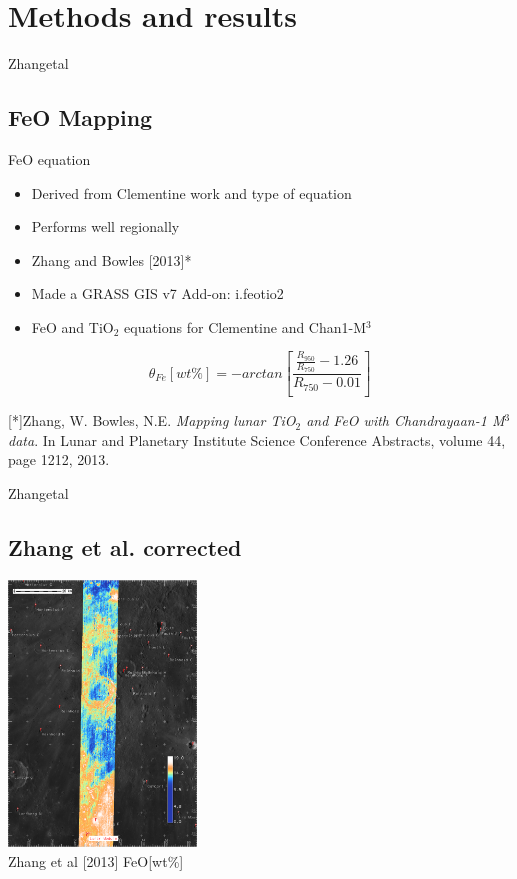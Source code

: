 \documentclass[aspectratio=169,unknownkeysallowed,xcolor=dvipsnames,beamer]{beamer} %
\begin{document}
\section{Methods and results}
\begin{frame}[fragile]{Zhangetal}
\subsection{FeO Mapping}
\begin{block}{FeO equation}
\begin{itemize}
\item Derived from Clementine work and type of equation
\item Performs well regionally
\item Zhang and Bowles [2013]*
\item Made a GRASS GIS v7 Add-on: i.feotio2
\item FeO and TiO$_{2}$ equations for Clementine and Chan1-M$^3$
\end{itemize}
\end{block}
\begin{block}{}
\begin{equation}\label{zhang2013corrected}
 \theta_{Fe} [wt\%] = -arctan \left[ \frac {\frac {R_{950}} {R_{750}} - 1.26} {R_{750} - 0.01} \right]
\end{equation}
\end{block}
[*]{\small Zhang, W. Bowles, N.E. \textit{Mapping lunar TiO$_{2}$ and FeO with Chandrayaan-1 M$^3$ data}. In
Lunar and Planetary Institute Science Conference Abstracts, volume 44, page 1212,
2013.}
\end{frame}

\begin{frame}[fragile]{Zhangetal}
\subsection{Zhang et al. corrected}
\begin{center}
  \includegraphics[width=5cm]{images/fig7}\\
  Zhang et al [2013] FeO[wt\%]
  \end{center}
\end{frame}
\end{document}
